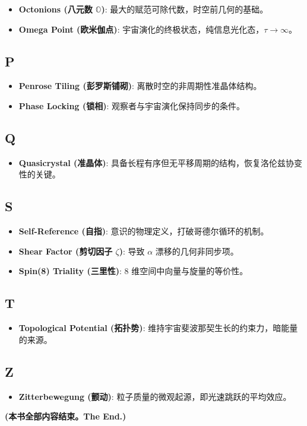 \begin{itemize}
\item \textbf{Octonions (八元数 $\mathbb{O}$)}: 最大的赋范可除代数，时空前几何的基础。
\item \textbf{Omega Point (欧米伽点)}: 宇宙演化的终极状态，纯信息光化态，$\tau \to \infty$。
\end{itemize}

\subsection{P}

\begin{itemize}
\item \textbf{Penrose Tiling (彭罗斯铺砌)}: 离散时空的非周期性准晶体结构。
\item \textbf{Phase Locking (锁相)}: 观察者与宇宙演化保持同步的条件。
\end{itemize}

\subsection{Q}

\begin{itemize}
\item \textbf{Quasicrystal (准晶体)}: 具备长程有序但无平移周期的结构，恢复洛伦兹协变性的关键。
\end{itemize}

\subsection{S}

\begin{itemize}
\item \textbf{Self-Reference (自指)}: 意识的物理定义，打破哥德尔循环的机制。
\item \textbf{Shear Factor (剪切因子 $\zeta$)}: 导致 $\alpha$ 漂移的几何非同步项。
\item \textbf{Spin(8) Triality (三里性)}: 8 维空间中向量与旋量的等价性。
\end{itemize}

\subsection{T}

\begin{itemize}
\item \textbf{Topological Potential (拓扑势)}: 维持宇宙斐波那契生长的约束力，暗能量的来源。
\end{itemize}

\subsection{Z}

\begin{itemize}
\item \textbf{Zitterbewegung (颤动)}: 粒子质量的微观起源，即光速跳跃的平均效应。
\end{itemize}

\hrulefill

\textbf{(本书全部内容结束。The End.)}
